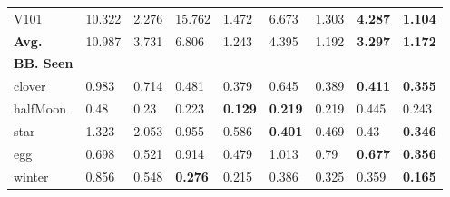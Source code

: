 \begin{table}[h]
{\begin{tabular}{C{2cm}|C{1.2cm}C{1.2cm}C{1.2cm}C{1.2cm}C{1.2cm}C{1.2cm}C{1.2cm}C{1.2cm}}
         V101 & 10.322 &  2.276 &  15.762 &  1.472 &  6.673 &  1.303 &  \textbf{4.287} &  \textbf{1.104} \\
        \textbf{Avg.} & 10.987 &  3.731 &  6.806 &  1.243 &  4.395 &  1.192 &  \textbf{3.297} &  \textbf{1.172} \\

        \midrule
        \midrule
    \raggedright \textbf{BB. Seen}  &  &  &  & \\

    clover & 0.983 &  0.714 &  0.481 &  0.379 &  0.645 &  0.389 &  \textbf{0.411} &  \textbf{0.355} \\
    
   halfMoon & 0.48 &  0.23 &  0.223 &  \textbf{0.129} &  \textbf{0.219} &  0.219 &  0.445 &  0.243 \\
   
 star & 1.323 &  2.053 &  0.955 &  0.586 &  \textbf{0.401} &  0.469 &  0.43 &  \textbf{0.346} \\
 
egg& 0.698 &  0.521 &  0.914 &  0.479 &  1.013 &  0.79 &  \textbf{0.677} &  \textbf{0.356} \\

 winter& 0.856 &  0.548 &  \textbf{0.276} &  0.215 &  0.386 &  0.325 &  0.359 &  \textbf{0.165} \\


\end{tabular}}
\end{table}
